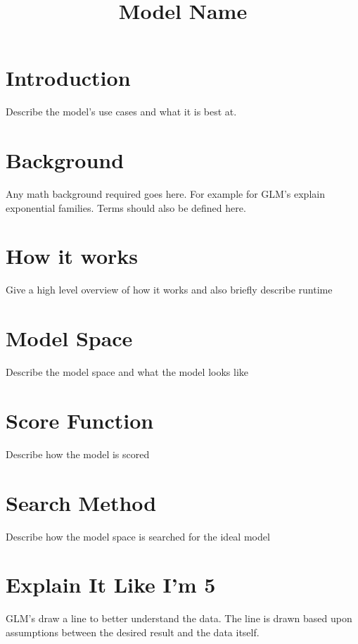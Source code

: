 \documentclass{article}
\title{Model Name}
\begin{document}
\maketitle

\section{Introduction}

Describe the model's use cases and what it is best at. 

\section{Background}

Any math background required goes here. For example for GLM's explain exponential families.
Terms should also be defined here. 

\section{How it works}

Give a high level overview of how it works and also briefly describe runtime




\section{Model Space}

Describe the model space and what the model looks like

\section{Score Function}

Describe how the model is scored


\section{Search Method}

Describe how the model space is searched for the ideal model


\section{Explain It Like I'm 5}

GLM's draw a line to better understand the data. The line is drawn based upon assumptions between the desired result and the data itself.
\end{document}
